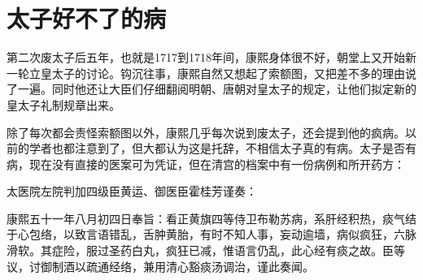 \begin{sectionnotes}









\end{sectionnotes}
\section{太子好不了的病}


第二次废太子后五年，也就是1717到1718年间，康熙身体很不好，朝堂上又开始新一轮立皇太子的讨论。钩沉往事，康熙自然又想起了索额图，又把差不多的理由说了一遍。同时他还让大臣们仔细翻阅明朝、唐朝对皇太子的规定，让他们拟定新的皇太子礼制规章出来。



除了每次都会责怪索额图以外，康熙几乎每次说到废太子，还会提到他的疯病。以前的学者也都注意到了，但大都认为这是托辞，不相信太子真的有病。太子是否有病，现在没有直接的医案可为凭证，但在清宫的档案中有一份病例和所开药方：



\begin{bookquote}太医院左院判加四级臣黄运、御医臣霍桂芳谨奏：\end{bookquote}


\begin{bookquote}康熙五十一年八月初四日奉旨：看正黄旗四等侍卫布勒苏病，系肝经积热，痰气结于心包络，以致言语错乱，舌肿黄胎，有时不知人事，妄动逾墙，病似疯狂，六脉滑软。其症险，服过圣药白丸，疯狂已减，惟语言仍乱，此心经有痰之故。臣等议，讨御制酒以疏通经络，兼用清心豁痰汤调治，谨此奏闻。\end{bookquote}

